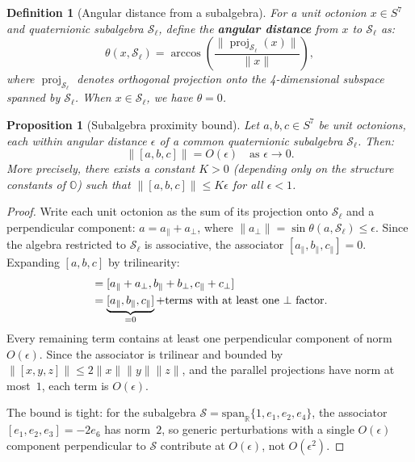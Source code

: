 \documentclass[11pt,a4paper]{article}
\newtheorem{definition}[theorem]{Definition}
\newtheorem{proposition}[theorem]{Proposition}
\theoremstyle{definition}
\theoremstyle{remark}
\DeclareMathOperator{\proj}{proj}
\newcommand{\Oct}{\mathbb{O}}
\newcommand{\Real}{\mathbb{R}}
\begin{document}
\begin{definition}[Angular distance from a subalgebra]
\label{def:angular-dist}
For a unit octonion $x \in S^7$ and quaternionic subalgebra $\mathcal{S}_\ell$, define the \textbf{angular distance} from $x$ to $\mathcal{S}_\ell$ as:
\begin{equation}
  \theta(x, \mathcal{S}_\ell) = \arccos\left( \frac{\lVert \proj_{\mathcal{S}_\ell}(x) \rVert}{\lVert x \rVert} \right),
\end{equation}
where $\proj_{\mathcal{S}_\ell}$ denotes orthogonal projection onto the 4-dimensional subspace spanned by $\mathcal{S}_\ell$. When $x \in \mathcal{S}_\ell$, we have $\theta = 0$.
\end{definition}

\begin{proposition}[Subalgebra proximity bound]
\label{prop:proximity}
Let $a, b, c \in S^7$ be unit octonions, each within angular distance $\epsilon$ of a common quaternionic subalgebra $\mathcal{S}_\ell$. Then:
\begin{equation}
  \lVert [a, b, c] \rVert = O(\epsilon) \quad \text{as } \epsilon \to 0.
  \label{eq:proximity-bound}
\end{equation}
More precisely, there exists a constant $K > 0$ (depending only on the structure constants of $\Oct$) such that $\lVert [a, b, c] \rVert \leq K \epsilon$ for all $\epsilon < 1$.
\end{proposition}

\begin{proof}
Write each unit octonion as the sum of its projection onto $\mathcal{S}_\ell$ and a perpendicular component: $a = a_\parallel + a_\perp$, where $\lVert a_\perp \rVert = \sin\theta(a, \mathcal{S}_\ell) \leq \epsilon$. Since the algebra restricted to $\mathcal{S}_\ell$ is associative, the associator $[a_\parallel, b_\parallel, c_\parallel] = 0$. Expanding $[a, b, c]$ by trilinearity:
\begin{align}
  [a, b, c] &= [a_\parallel + a_\perp, b_\parallel + b_\perp, c_\parallel + c_\perp] \notag \\
            &= \underbrace{[a_\parallel, b_\parallel, c_\parallel]}_{= 0}
               + \text{terms with at least one $\perp$ factor}.
\end{align}
Every remaining term contains at least one perpendicular component of norm $O(\epsilon)$. Since the associator is trilinear and bounded by $\lVert [x,y,z] \rVert \leq 2\lVert x \rVert \lVert y \rVert \lVert z \rVert$, and the parallel projections have norm at most~$1$, each term is $O(\epsilon)$.

The bound is tight: for the subalgebra $\mathcal{S} = \text{span}_\Real\{1, e_1, e_2, e_4\}$, the associator $[e_1, e_2, e_3] = -2e_6$ has norm~$2$, so generic perturbations with a single $O(\epsilon)$ component perpendicular to $\mathcal{S}$ contribute at $O(\epsilon)$, not $O(\epsilon^2)$.
\end{proof}
\end{document}
